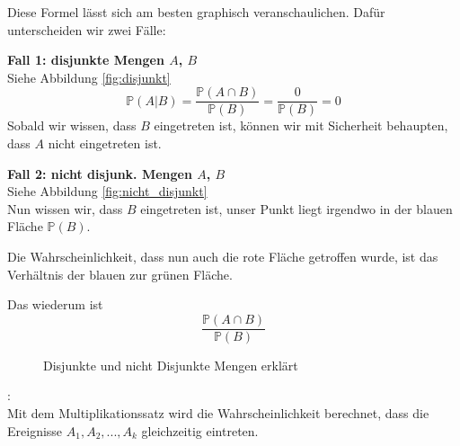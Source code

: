 {    Diese Formel lässt sich am besten graphisch veranschaulichen. Dafür
    unterscheiden wir zwei Fälle:
    \begin{multicols}{2}
        \textbf{Fall 1: disjunkte Mengen $A$, $B$}\\
        Siehe Abbildung \ref{fig:disjunkt}
    \begin{equation*}
        \mathbb{P}\left(A|B\right)=\frac{\mathbb{P}\left(A\cap B\right)}{\mathbb{P}(B)}=\frac{0}{\mathbb{P}(B)}=0
    \end{equation*}
    Sobald wir wissen, dass $B$ eingetreten ist, können wir mit Sicherheit
    behaupten, dass $A$ nicht eingetreten ist.

    \columnbreak
        \textbf{Fall 2: nicht disjunk. Mengen $A$, $B$}\\ 
        Siehe Abbildung \ref{fig:nicht_disjunkt}\\

        Nun wissen wir, dass $B$ eingetreten ist, unser Punkt liegt irgendwo in
        der blauen Fläche $\mathbb{P}(B)$.

    Die Wahrscheinlichkeit, dass nun auch
    die rote Fläche getroffen wurde, ist das Verhältnis der
    blauen zur grünen Fläche.

    Das wiederum ist
        \[\frac{\mathbb{P}(A\cap B)}{\mathbb{P}(B)}\]
    \end{multicols}

    \begin{figure}
    \centering
    \label{fig:teilmengen}
    \caption{Disjunkte und nicht Disjunkte Mengen erklärt}
    \end{figure}

    \begin{satz}:
        \label{satz:multiplikationssatz}
        \\
        Mit dem Multiplikationssatz wird die Wahrscheinlichkeit berechnet, dass
        die Ereignisse  $A_{1},A_{2},...,A_{k}$ gleichzeitig eintreten.


\end{satz}}
